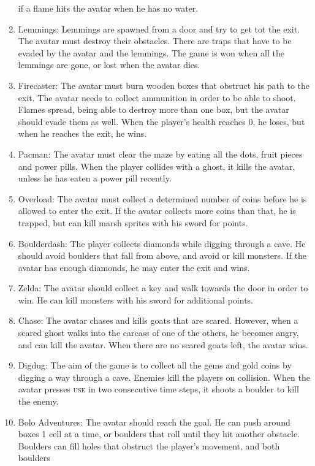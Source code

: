 \begin{enumerate}
		if a flame hits the avatar when he has no water. 
	\item Lemmings:
		Lemmings are spawned from a door and try to get tot the exit. The avatar
		must destroy their obstacles. There are traps that have to be evaded by
		the avatar and the lemmings. The game is won when all the lemmings are
		gone, or lost when the avatar dies.
	\item Firecaster:
		The avatar must burn wooden boxes that obstruct his path to the exit.
		The avatar needs to collect ammunition in order to be able to shoot.
		Flames spread, being able to destroy more than one box, but the avatar
		should evade them as well. When the player's health reaches 0, he loses,
		but when he reaches the exit, he wins.
	\item Pacman:
		The avatar must clear the maze by eating all the dots, fruit pieces and
		power pills.  When the player collides with a ghost, it kills the
		avatar, unless he has eaten a power pill recently.
	\item Overload:
		The avatar must collect a determined number of coins before he is
		allowed to enter the exit. If the avatar collects more coins than that,
		he is trapped, but can kill marsh sprites with his sword for points.
	\item Boulderdash:
		The player collects diamonds while digging through a cave. He should
		avoid boulders that fall from above, and avoid or kill monsters. If the
		avatar has enough diamonds, he may enter the exit and wins.
	\item Zelda:
		The avatar should collect a key and walk towards the door in order to
		win. He can kill monsters with his sword for additional points.
	\item Chase:
		The avatar chases and kills goats that are scared. However, when a
		scared ghost walks into the carcass of one of the others, he becomes
		angry, and can kill the avatar. When there are no scared goats left, the
		avatar wins.
	\item Digdug:
		The aim of the game is to collect all the gems and gold coins by digging
		a way through a cave. Enemies kill the players on collision. When the
		avatar presses \textsc{use} in two consecutive time steps, it shoots a boulder to
		kill the enemy.
	\item Bolo Adventures:
		The avatar should reach the goal. He can push around boxes 1 cell at a
		time, or boulders that roll until they hit another obstacle. Boulders
		can fill holes that obstruct the player's movement, and both boulders

\end{enumerate}
